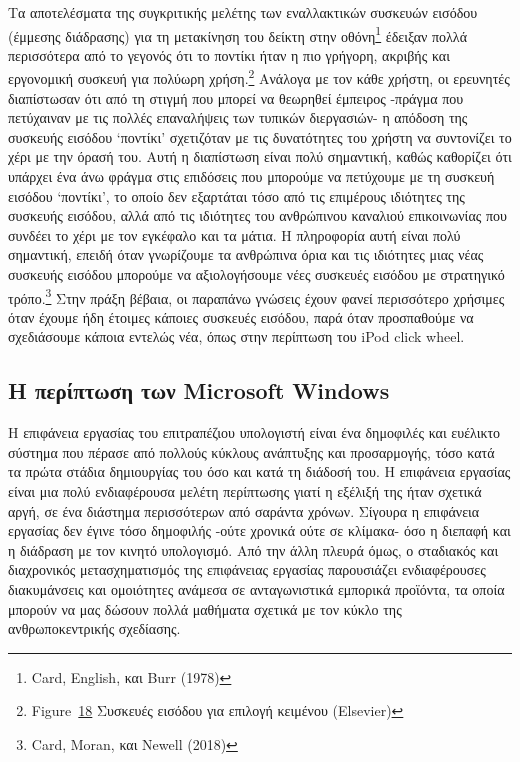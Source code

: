 \documentclass[
]{article}
\begin{document}
Τα αποτελέσματα της συγκριτικής μελέτης των εναλλακτικών συσκευών
εισόδου (έμμεσης διάδρασης) για τη μετακίνηση του δείκτη στην
οθόνη\footnote{Card, English, και Burr (1978)} έδειξαν πολλά περισσότερα
από το γεγονός ότι το ποντίκι ήταν η πιο γρήγορη, ακριβής και εργονομική
συσκευή για πολύωρη χρήση.\footnote{Figure~\protect\hyperlink{fig:input-comparison}{18}
  Συσκευές εισόδου για επιλογή κειμένου (Elsevier)} Ανάλογα με τον κάθε
χρήστη, οι ερευνητές διαπίστωσαν ότι από τη στιγμή που μπορεί να
θεωρηθεί έμπειρος -πράγμα που πετύχαιναν με τις πολλές επαναλήψεις των
τυπικών διεργασιών- η απόδοση της συσκευής εισόδου `ποντίκι' σχετιζόταν
με τις δυνατότητες του χρήστη να συντονίζει το χέρι με την όρασή του.
Αυτή η διαπίστωση είναι πολύ σημαντική, καθώς καθορίζει ότι υπάρχει ένα
άνω φράγμα στις επιδόσεις που μπορούμε να πετύχουμε με τη συσκευή
εισόδου `ποντίκι', το οποίο δεν εξαρτάται τόσο από τις επιμέρους
ιδιότητες της συσκευής εισόδου, αλλά από τις ιδιότητες του ανθρώπινου
καναλιού επικοινωνίας που συνδέει το χέρι με τον εγκέφαλο και τα μάτια.
Η πληροφορία αυτή είναι πολύ σημαντική, επειδή όταν γνωρίζουμε τα
ανθρώπινα όρια και τις ιδιότητες μιας νέας συσκευής εισόδου μπορούμε να
αξιολογήσουμε νέες συσκευές εισόδου με στρατηγικό τρόπο.\footnote{Card,
  Moran, και Newell (2018)} Στην πράξη βέβαια, οι παραπάνω γνώσεις έχουν
φανεί περισσότερο χρήσιμες όταν έχουμε ήδη έτοιμες κάποιες συσκευές
εισόδου, παρά όταν προσπαθούμε να σχεδιάσουμε κάποια εντελώς νέα, όπως
στην περίπτωση του iPod click wheel.

\hypertarget{ux3b7-ux3c0ux3b5ux3c1ux3afux3c0ux3c4ux3c9ux3c3ux3b7-ux3c4ux3c9ux3bd-microsoft-windows}{%
\subsection{Η περίπτωση των Microsoft
Windows}\label{ux3b7-ux3c0ux3b5ux3c1ux3afux3c0ux3c4ux3c9ux3c3ux3b7-ux3c4ux3c9ux3bd-microsoft-windows}}

Η επιφάνεια εργασίας του επιτραπέζιου υπολογιστή είναι ένα δημοφιλές και
ευέλικτο σύστημα που πέρασε από πολλούς κύκλους ανάπτυξης και
προσαρμογής, τόσο κατά τα πρώτα στάδια δημιουργίας του όσο και κατά τη
διάδοσή του. Η επιφάνεια εργασίας είναι μια πολύ ενδιαφέρουσα μελέτη
περίπτωσης γιατί η εξέλιξή της ήταν σχετικά αργή, σε ένα διάστημα
περισσότερων από σαράντα χρόνων. Σίγουρα η επιφάνεια εργασίας δεν έγινε
τόσο δημοφιλής -ούτε χρονικά ούτε σε κλίμακα- όσο η διεπαφή και η
διάδραση με τον κινητό υπολογισμό. Από την άλλη πλευρά όμως, ο σταδιακός
και διαχρονικός μετασχηματισμός της επιφάνειας εργασίας παρουσιάζει
ενδιαφέρουσες διακυμάνσεις και ομοιότητες ανάμεσα σε ανταγωνιστικά
εμπορικά προϊόντα, τα οποία μπορούν να μας δώσουν πολλά μαθήματα σχετικά
με τον κύκλο της ανθρωποκεντρικής σχεδίασης.
\end{document}
